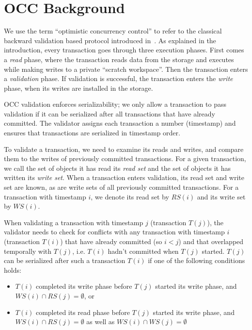 \section{OCC Background}\label{sec:background}

We use the term ``optimistic concurrency control'' to refer to the classical backward validation based protocol introduced in~\cite{kung81tods}. As explained in the introduction, every transaction goes through three execution phases. First comes a \emph{read} phase, where the transaction reads data from the storage and executes while making writes to a private ``scratch workspace''. Then the transaction enters a \emph{validation} phase. If validation is successful, the transaction enters the \emph{write} phase, when its writes are installed in the storage. 

OCC validation enforces serializability; we only allow a transaction to pass validation if it can be serialized after all transactions that have already committed. The validator assigns each transaction a number (timestamp) and ensures that transactions are serialized in timestamp order.

To validate a transaction, we need to examine its reads and writes, and compare them to the writes of previously committed transactions. For a given transaction, we call the set of objects it has read its \emph{read set} and the set of objects it has written its \emph{write set}. When a transaction enters validation, its read set and write set are known, as are write sets of all previously committed transactions. For a transaction with timestamp $i$, we denote its read set by $RS(i)$ and its write set by $WS(i)$.

When validating a transaction with timestamp $j$ (transaction $T(j)$), the validator needs to check for conflicts with any transaction with timestamp $i$ (transaction $T(i)$) that have already committed (so $i < j$) and that overlapped temporally with $T(j)$, i.e. $T(i)$ hadn't committed when $T(j)$ started. 
$T(j)$ can be serialized after such a transaction $T(i)$ if one of the following conditions holds:
\begin{itemize}
\vspace{-.5em}
\item $T(i)$ completed its write phase before $T(j)$ started its write phase, and $WS(i) \cap RS(j) = \emptyset$, or
\vspace{-.5em}
\item $T(i)$ completed its read phase before $T(j)$ started its write phase, and $WS(i) \cap RS(j) = \emptyset$ as well as $WS(i) \cap WS(j) = \emptyset$
\vspace{-.5em}
\end{itemize}

